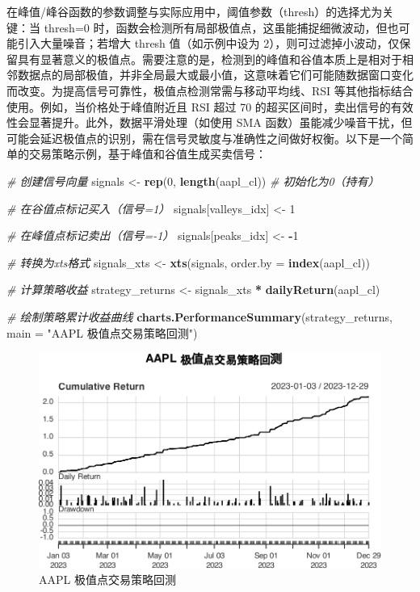 \documentclass[]{ctexbook}
\newenvironment{Shaded}{\begin{snugshade}}{\end{snugshade}}
\newcommand{\AttributeTok}[1]{\textcolor[rgb]{0.13,0.29,0.53}{#1}}
\newcommand{\CommentTok}[1]{\textcolor[rgb]{0.56,0.35,0.01}{\textit{#1}}}
\newcommand{\DecValTok}[1]{\textcolor[rgb]{0.00,0.00,0.81}{#1}}
\newcommand{\FunctionTok}[1]{\textcolor[rgb]{0.13,0.29,0.53}{\textbf{#1}}}
\newcommand{\NormalTok}[1]{#1}
\newcommand{\OtherTok}[1]{\textcolor[rgb]{0.56,0.35,0.01}{#1}}
\newcommand{\SpecialCharTok}[1]{\textcolor[rgb]{0.81,0.36,0.00}{\textbf{#1}}}
\newcommand{\StringTok}[1]{\textcolor[rgb]{0.31,0.60,0.02}{#1}}
\begin{document}
在峰值/峰谷函数的参数调整与实际应用中，阈值参数（thresh）的选择尤为关键：当 thresh=0 时，函数会检测所有局部极值点，这虽能捕捉细微波动，但也可能引入大量噪音；若增大 thresh 值（如示例中设为 2），则可过滤掉小波动，仅保留具有显著意义的极值点。需要注意的是，检测到的峰值和谷值本质上是相对于相邻数据点的局部极值，并非全局最大或最小值，这意味着它们可能随数据窗口变化而改变。为提高信号可靠性，极值点检测常需与移动平均线、RSI 等其他指标结合使用。例如，当价格处于峰值附近且 RSI 超过 70 的超买区间时，卖出信号的有效性会显著提升。此外，数据平滑处理（如使用 SMA 函数）虽能减少噪音干扰，但可能会延迟极值点的识别，需在信号灵敏度与准确性之间做好权衡。以下是一个简单的交易策略示例，基于峰值和谷值生成买卖信号：

\begin{Shaded}
\begin{Highlighting}[]
\CommentTok{\# 创建信号向量}
\NormalTok{signals }\OtherTok{\textless{}{-}} \FunctionTok{rep}\NormalTok{(}\DecValTok{0}\NormalTok{, }\FunctionTok{length}\NormalTok{(aapl\_cl))  }\CommentTok{\# 初始化为0（持有）}

\CommentTok{\# 在谷值点标记买入（信号=1）}
\NormalTok{signals[valleys\_idx] }\OtherTok{\textless{}{-}} \DecValTok{1}

\CommentTok{\# 在峰值点标记卖出（信号={-}1）}
\NormalTok{signals[peaks\_idx] }\OtherTok{\textless{}{-}} \SpecialCharTok{{-}}\DecValTok{1}

\CommentTok{\# 转换为xts格式}
\NormalTok{signals\_xts }\OtherTok{\textless{}{-}} \FunctionTok{xts}\NormalTok{(signals, }\AttributeTok{order.by =} \FunctionTok{index}\NormalTok{(aapl\_cl))}

\CommentTok{\# 计算策略收益}
\NormalTok{strategy\_returns }\OtherTok{\textless{}{-}}\NormalTok{ signals\_xts }\SpecialCharTok{*} \FunctionTok{dailyReturn}\NormalTok{(aapl\_cl)}

\CommentTok{\# 绘制策略累计收益曲线}
\FunctionTok{charts.PerformanceSummary}\NormalTok{(strategy\_returns, }
                          \AttributeTok{main =} \StringTok{"AAPL 极值点交易策略回测"}\NormalTok{)}
\end{Highlighting}
\end{Shaded}

\begin{figure}
\includegraphics[width=0.9\linewidth]{quantmod_files/figure-latex/signal-1} \caption{AAPL 极值点交易策略回测}\label{fig:signal}
\end{figure}
\end{document}
